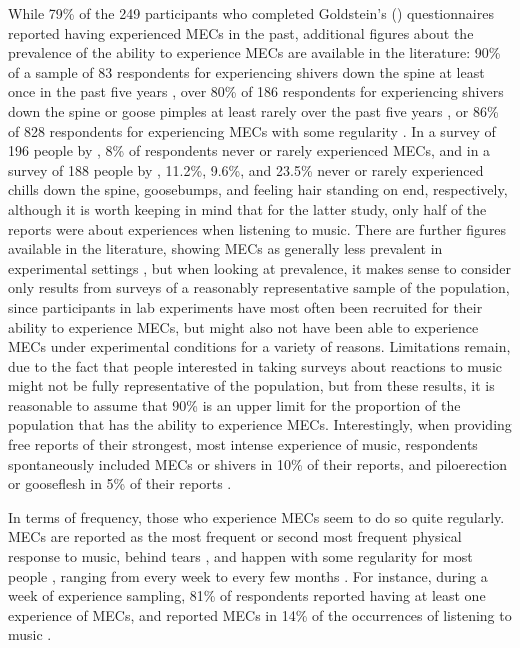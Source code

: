 While 79\% of the 249 participants who completed Goldstein’s (\citeyear{goldstein1980}) questionnaires reported having experienced MECs in the past, additional figures about the prevalence of the ability to experience MECs are available in the literature: 90\% of a sample of 83 respondents for experiencing shivers down the spine at least once in the past five years \parencite[also reporting 62\% for goose pimples and 31\% for trembling]{sloboda1991}, over 80\% of 186 respondents for experiencing shivers down the spine or goose pimples at least rarely over the past five years \parencite{mlejnek2013}, or 86\% of 828 respondents for experiencing MECs with some regularity \parencite{panksepp1995}. In a survey of 196 people by \textcite{nusbaum2011}, 8\% of respondents never or rarely experienced MECs, and in a survey of 188 people by \textcite{silvia2011}, 11.2\%, 9.6\%, and 23.5\% never or rarely experienced chills down the spine, goosebumps, and feeling hair standing on end, respectively, although it is worth keeping in mind that for the latter study, only half of the reports were about experiences when listening to music. There are further figures available in the literature, showing MECs as generally less prevalent in experimental settings \parencite[e.g.,][]{colver2016, grewe2009a, konecni2007b}, but when looking at prevalence, it makes sense to consider only results from surveys of a reasonably representative sample of the population, since participants in lab experiments have most often been recruited for their ability to experience MECs, but might also not have been able to experience MECs under experimental conditions for a variety of reasons. Limitations remain, due to the fact that people interested in taking surveys about reactions to music might not be fully representative of the population, but from these results, it is reasonable to assume that 90\% is an upper limit for the proportion of the population that has the ability to experience MECs. Interestingly, when providing free reports of their strongest, most intense experience of music, respondents spontaneously included MECs or shivers in 10\% of their reports, and piloerection or gooseflesh in 5\% of their reports \parencite{gabrielsson2011}.

In terms of frequency, those who experience MECs seem to do so quite regularly. MECs are reported as the most frequent \parencite{sloboda1991} or second most frequent physical response to music, behind tears \parencite{gabrielsson2011, scherer2001}, and happen with some regularity for most people \parencite{panksepp1995}, ranging from every week to every few months \parencite{bannister2020a, goldstein1980}. For instance, during a week of experience sampling, 81\% of respondents reported having at least one experience of MECs, and reported MECs in 14\% of the occurrences of listening to music \parencite{nusbaum2014}.

